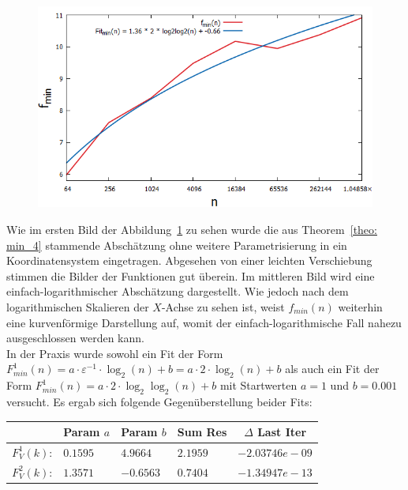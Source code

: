 \begin{figure}[H]
\begin{minipage}[t]{.30\textwidth}
        \includegraphics[width=1.21\textwidth]{pictures/min_theo4_2_fit_min_loglog.png}
    \end{minipage}
    \vspace*{-.1cm}
    \label{fig: min_theo4_fit_min}
\end{figure}

\noindent
Wie im ersten Bild der Abbildung~\ref{fig: min_theo4_fit_min} zu sehen wurde die aus Theorem~\ref{theo: min_4} stammende Abschätzung ohne weitere Parametrisierung in ein Koordinatensystem eingetragen. Abgesehen von einer leichten Verschiebung stimmen die Bilder der Funktionen gut überein. Im mittleren Bild wird eine einfach-logarithmischer Abschätzung dargestellt. Wie jedoch nach dem logarithmischen Skalieren der $X$-Achse zu sehen ist, weist $f_{min}(n)$ weiterhin eine kurvenförmige Darstellung auf, womit der einfach-logarithmische Fall nahezu ausgeschlossen werden kann.\\[.1cm]
In der Praxis wurde sowohl ein Fit der Form $F_{min}^1(n)= a \cdot \varepsilon^{-1}\cdot \log_2(n) + b = a \cdot 2\cdot\log_2(n) + b$ als auch ein Fit der Form $F_{min}^1(n)= a \cdot 2\cdot\log_2\log_2(n) + b$ mit Startwerten $a=1$ und $b=0.001$ versucht. Es ergab sich folgende Gegenüberstellung beider Fits:

\begin{center}
\begin{tabular}{c||l|l|l|l}

&\multicolumn{1}{c|}{Param $a$}&
\multicolumn{1}{c|}{Param $b$}&
\multicolumn{1}{c|}{Sum Res}&
\multicolumn{1}{c}{$\Delta$ Last Iter}\\
\hline
$F_V^1(k)$:&$0.1595$&$4.9664$&$2.1959$&$-2.03746e-09$\\
\hline
$F_V^2(k)$:&$1.3571$&$-0.6563$&$0.7404$&$-1.34947e-13$

\end{tabular}
\end{center}

